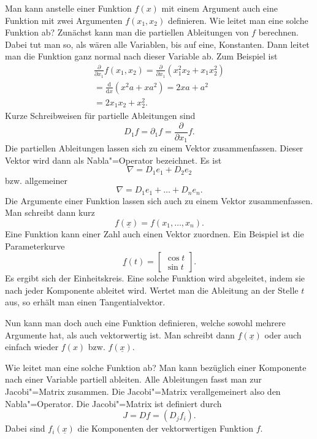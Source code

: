 \documentclass[a4paper,11pt,fleqn,twocolumn,twoside]{scrartcl}
\numberwithin{equation}{section}
\begin{document}
Man kann anstelle einer Funktion $f(x)$ mit einem Argument auch
eine Funktion mit zwei Argumenten $f(x_1,x_2)$ definieren. Wie
leitet man eine solche Funktion ab? Zunächst kann man die partiellen
Ableitungen von $f$ berechnen. Dabei tut man so, als wären alle
Variablen, bis auf eine, Konstanten. Dann leitet man die Funktion ganz
normal nach dieser Variable ab. Zum Beispiel ist
\begin{gather*}
\frac{\partial}{\partial x_1}f(x_1,x_2)
= \frac{\partial}{\partial x_1} (x_1^2x_2+x_1x_2^2)\\
= \frac{\mathrm d}{\mathrm dx} (x^2a+xa^2) = 2xa+a^2\\
= 2x_1x_2+x_2^2.
\end{gather*}
\noindent
Kurze Schreibweisen für partielle Ableitungen sind
\begin{equation}
D_1f = \partial_1f = \frac{\partial}{\partial x_1}f.
\end{equation}
\noindent
Die partiellen Ableitungen lassen sich zu einem Vektor zusammenfassen.
Dieser Vektor wird dann als Nabla"=Operator bezeichnet. Es ist
\begin{equation}
\nabla = D_1e_1+D_2e_2
\end{equation}
\noindent
bzw. allgemeiner
\begin{equation}
\nabla = D_1e_1+\dots+D_ne_n.
\end{equation}
\noindent
Die Argumente einer Funktion lassen sich auch zu einem Vektor
zusammenfassen. Man schreibt dann kurz
\begin{equation}
f(\underline x) = f(x_1,\dots,x_n).
\end{equation}
\noindent
Eine Funktion kann einer Zahl auch einen Vektor zuordnen.
Ein Beispiel ist die Parameterkurve
\begin{equation}
\underline f(t) = \begin{bmatrix}\cos t\\ \sin t\end{bmatrix}.
\end{equation}
\noindent
Es ergibt sich der Einheitskreis. Eine solche Funktion wird
abgeleitet, indem sie nach jeder Komponente ableitet wird.
Wertet man die Ableitung an der Stelle $t$ aus, so erhält man
einen Tangentialvektor.

Nun kann man doch auch eine Funktion definieren, welche sowohl
mehrere Argumente hat, als auch vektorwertig ist. Man schreibt dann
$\underline f(\underline x)$ oder auch einfach wieder
$f(x)$ bzw. $f(\underline x)$.

Wie leitet man eine solche Funktion ab? Man kann bezüglich einer
Komponente nach einer Variable partiell ableiten. Alle Ableitungen
fasst man zur Jacobi"=Matrix zusammen. Die Jacobi"=Matrix
verallgemeinert also den Nabla"=Operator. Die Jacobi"=Matrix ist
definiert durch
\begin{equation}
J = Df = (D_j f_i).
\end{equation}
\noindent
Dabei sind $f_i(\underline x)$ die Komponenten der vektorwertigen
Funktion $f$.
\end{document}
